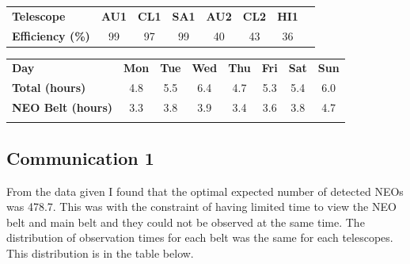 \documentclass{article}
\begin{document}
\begin{table}[h]
	\begin{tabular}{lccccccc}
		\rowcolor[HTML]{FAFAFA} 
		\textbf{Telescope}       & \textbf{AU1} & \textbf{CL1} & \textbf{SA1} &  \textbf{AU2} &  \textbf{CL2} &  \textbf{HI1}  \\
		\rowcolor[HTML]{FAFAFA} 
		\textbf{Efficiency (\%)} &  99           &  97         &  99           &  40           &  43           &  36            \\                   
	\end{tabular}
\end{table}
\begin{table}[h]
	\begin{tabular}{lccccccc}
		\rowcolor[HTML]{FAFAFA} 
		{ \textbf{Day}}              & { \textbf{Mon}} & { \textbf{Tue}} & { \textbf{Wed}} & { \textbf{Thu}} & { \textbf{Fri}} & { \textbf{Sat}} & { \textbf{Sun}} \\
		\rowcolor[HTML]{FAFAFA} 
		{ \textbf{Total (hours)}}    & { 4.8}          & { 5.5}          & { 6.4}          & { 4.7}          & { 5.3}          & { 5.4}          & { 6.0}          \\
		\rowcolor[HTML]{FAFAFA} 
		{ \textbf{NEO Belt (hours)}} & { 3.3}          & { 3.8}          & { 3.9}          & { 3.4}          & { 3.6}          & { 3.8}          & { 4.7}          \\
													& \multicolumn{1}{l}{}                & \multicolumn{1}{l}{}                & \multicolumn{1}{l}{}                & \multicolumn{1}{l}{}                & \multicolumn{1}{l}{}                & \multicolumn{1}{l}{}                & \multicolumn{1}{l}{}               
	\end{tabular}
\end{table}

\subsection*{Communication 1}
From the data given I found that the optimal expected number of detected NEOs was 478.7.
This was with the constraint of having limited time to view the NEO belt and main belt and they could not be observed at the same time.
The distribution of observation times for each belt was the same for each telescopes.
This distribution is in the table below.
\end{document}
